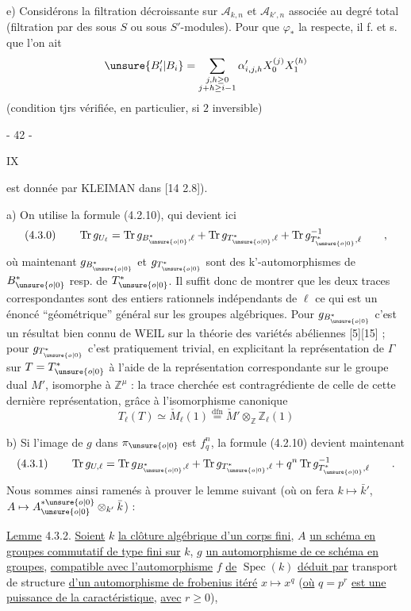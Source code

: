e) Considérons la filtration décroissante sur
$\mathcal A_{k,n}$ et $\mathcal A_{k',n}$ associée au degré total
(filtration par des sous $S$ ou sous $S'$-modules).
Pour que $\varphi_*$ la respecte, il f. et s. que l'on ait
\[
 \unsure{B'_i|B_i}=\sum_{\substack{j,h\geq0\\j+h\geq i-1}}
 \alpha'_{i,j,h}X_0^{(j)}X_1^{(h)}
\]
(condition tjrs vérifiée, en particulier, si $2$ inversible)
\begin{center}- 42 -\end{center}\hfill IX

est donnée par KLEIMAN dans [14 2.8]).

a) On utilise la formule (4.2.10), qui devient ici
\[
 (4.3.0)\qquad\operatorname{Tr}g_{U_\ell}
 =\operatorname{Tr}g_{B_{\unsure{o|0}}^*,\ell}+\operatorname{Tr}g_{T_{\unsure{o|0}}^*,\ell}
 +\operatorname{Tr}g^{-1}_{T_{\unsure{o|0}}^*,\ell}\qquad,
\]
où maintenant $g_{B_{\unsure{o|0}}^*}$ et $g_{T_{\unsure{o|0}}^*}$ sont des k'-automorphismes de $B_{\unsure{o|0}}^*$ resp. de $T_{\unsure{o|0}}^*$.
Il suffit donc de montrer que les deux traces correspondantes sont
des entiers rationnels indépendants de $\ell$ ce qui est un énoncé ``géométrique'' général sur les groupes algébriques. Pour $g_{B_{\unsure{o|0}}^*}$ c'est un résultat
bien connu de WEIL sur la théorie des variétés abéliennes [5\quad][15\quad] ;
pour $g_{T_{\unsure{o|0}}^*}$ c'est pratiquement trivial, en explicitant la représentation
de $\Gamma$ sur $T=T_{\unsure{o|0}}^*$ à l'aide de la représentation correspondante sur le groupe
dual $M'$, isomorphe à $\mathbb Z^\mu$ : la trace cherchée est contragrédiente de celle
de cette dernière représentation, grâce à l'isomorphisme canonique
\[
 T_\ell(T)\simeq\check M_\ell(1)\overset{\mathrm{dfn}}{=}
 \check M'\otimes_{\mathbb Z}\mathbb Z_\ell(1)
\]

b) Si l'image de $g$ dans $\pi_{\unsure{o|0}}$ est $f_q^n$, la formule (4.2.10)
devient maintenant
\[
 (4.3.1)\qquad\operatorname{Tr}g_{U,\ell}
 =\operatorname{Tr}g_{B_{\unsure{o|0}}^*,\ell}+\operatorname{Tr}g_{T_{\unsure{o|0}}^*,\ell}
 +q^n\operatorname{Tr}g^{-1}_{T_{\unsure{o|0}}^*,\ell}\qquad.
\]
Nous sommes ainsi ramenés à prouver le lemme suivant (où on fera $k\mapsto\bar k'$,
$A\mapsto A_{\unsure{o|0}}^{*\unsure{o|0}}\otimes_{k'}\bar k$) :

\uline{Lemme} 4.3.2. \uline{Soient} $k$ \uline{la clôture algébrique d'un corps fini}, $A$ \uline{un schéma
en groupes commutatif de type fini sur} $k$, $g$ \uline{un automorphisme de ce
schéma en groupes}, \uline{compatible avec l'automorphisme} $f$ \uline{de} $\operatorname{Spec}(k)$ \uline{déduit
par} transport de structure \uline{d'un automorphisme de frobenius itéré}
$x\mapsto x^q$ (\uline{où} $q=p^r$ \uline{est une puissance de la caractéristique}, \uline{avec} $r\geq0$),

